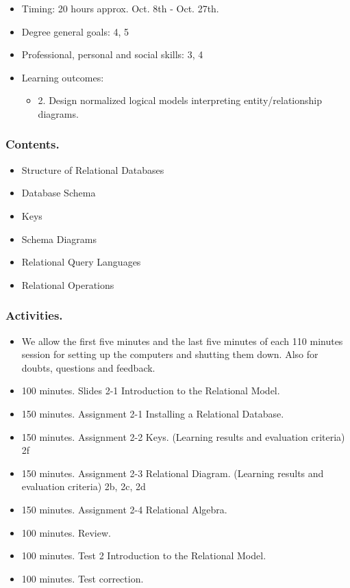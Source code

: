 \documentclass[catalan, a4paper, 12pt, titlepage]{article}
\begin{document}
  \begin{itemize}
	\item Timing: 20 hours approx. Oct. 8th - Oct. 27th.
	\item Degree general goals: 4, 5
	\item Professional, personal and social skills: 3, 4
	\item Learning outcomes: 
		\begin{itemize}
			\item 2. Design normalized logical models interpreting entity/relationship diagrams.
		\end{itemize}
  \end{itemize}

  \subsubsection{Contents.}

  \begin{itemize}
	  \item Structure of Relational Databases
	  \item Database Schema
	  \item Keys
	  \item Schema Diagrams
	  \item Relational Query Languages
	  \item Relational Operations
  \end{itemize}

  \subsubsection{Activities.}

  \begin{itemize}
          \item We allow the first five minutes and the last five minutes of each 110 minutes session for setting up the computers and shutting them down. Also for doubts, questions and feedback.
          \item 100 minutes. Slides 2-1 Introduction to the Relational Model.
	  \item 150 minutes. Assignment 2-1 Installing a Relational Database.
	  \item 150 minutes. Assignment 2-2 Keys. (\faGraduationCap Learning results and evaluation criteria) 2f
	  \item 150 minutes. Assignment 2-3 Relational Diagram. (\faGraduationCap Learning results and evaluation criteria) 2b, 2c, 2d
	  \item 150 minutes. Assignment 2-4 Relational Algebra.
	  \item 100 minutes. Review.
	  \item 100 minutes. Test 2 Introduction to the Relational Model.
	  \item 100 minutes. Test correction.
  \end{itemize}
\end{document}
